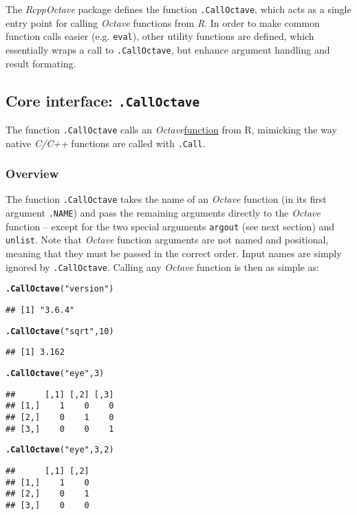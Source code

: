 \documentclass[english,10pt,a4paper]{article}\usepackage[]{graphicx}\usepackage[]{color}
\makeatletter
\newcommand{\hlnum}[1]{\textcolor[rgb]{0.686,0.059,0.569}{#1}}%
\newcommand{\hlstr}[1]{\textcolor[rgb]{0.192,0.494,0.8}{#1}}%
\newcommand{\hlstd}[1]{\textcolor[rgb]{0.345,0.345,0.345}{#1}}%
\newcommand{\hlkwd}[1]{\textcolor[rgb]{0.737,0.353,0.396}{\textbf{#1}}}%
\newenvironment{kframe}{%
 \def\at@end@of@kframe{}%
 \ifinner\ifhmode%
  \def\at@end@of@kframe{\end{minipage}}%
  \begin{minipage}{\columnwidth}%
 \fi\fi%
 \def\FrameCommand##1{\hskip\@totalleftmargin \hskip-\fboxsep
 \colorbox{shadecolor}{##1}\hskip-\fboxsep
     \hskip-\linewidth \hskip-\@totalleftmargin \hskip\columnwidth}%
 \MakeFramed {\advance\hsize-\width
   \@totalleftmargin\z@ \linewidth\hsize
   \@setminipage}}%
 {\par\unskip\endMakeFramed%
 \at@end@of@kframe}
\newenvironment{knitrout}{}{} %
\let\proglang=\textit
\let\code=\texttt
\newcommand{\pkgname}[1]{\textit{#1}\xspace}
\newcommand{\Rpkg}[1]{\pkgname{#1} package\xspace}
\newcommand{\octave}{\proglang{Octave}\xspace}
\makeatother
\begin{document}
The \Rpkg{RcppOctave} defines the function \code{.CallOctave}, which acts as a
single entry point for calling \octave functions from \proglang{R}.
In order to make common function calls easier (e.g. \code{eval}), other utility
functions are defined, which essentially wraps a call to \code{.CallOctave}, but
enhance argument handling and result formating.

\subsection{Core interface: \texttt{.CallOctave}}
The function \code{.CallOctave} calls an \octave \underline{function}
from R, mimicking the way native \proglang{C/C++} functions are called with
\code{.Call}.

\subsubsection{Overview}

The function \code{.CallOctave} takes the name of an \octave function (in its
first argument \code{.NAME}) and pass the remaining arguments directly to the
\octave function -- except for the two special arguments \code{argout} (see next
section) and \code{unlist}.
Note that \octave function arguments are not named and positional, meaning that
they must be passed in the correct order.
Input names are simply ignored by \code{.CallOctave}.
Calling any \octave function is then as simple as: 

\begin{knitrout}
\color{fgcolor}\begin{kframe}
\begin{alltt}
\hlkwd{.CallOctave}\hlstd{(}\hlstr{"version"}\hlstd{)}
\end{alltt}
\begin{verbatim}
## [1] "3.6.4"
\end{verbatim}
\begin{alltt}
\hlkwd{.CallOctave}\hlstd{(}\hlstr{"sqrt"}\hlstd{,} \hlnum{10}\hlstd{)}
\end{alltt}
\begin{verbatim}
## [1] 3.162
\end{verbatim}
\begin{alltt}
\hlkwd{.CallOctave}\hlstd{(}\hlstr{"eye"}\hlstd{,} \hlnum{3}\hlstd{)}
\end{alltt}
\begin{verbatim}
##      [,1] [,2] [,3]
## [1,]    1    0    0
## [2,]    0    1    0
## [3,]    0    0    1
\end{verbatim}
\begin{alltt}
\hlkwd{.CallOctave}\hlstd{(}\hlstr{"eye"}\hlstd{,} \hlnum{3}\hlstd{,} \hlnum{2}\hlstd{)}
\end{alltt}
\begin{verbatim}
##      [,1] [,2]
## [1,]    1    0
## [2,]    0    1
## [3,]    0    0
\end{verbatim}
\end{kframe}
\end{knitrout}
\end{document}

